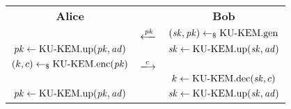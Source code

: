\begin{tabular}{cC{1cm}c}
    \textbf{Alice} &  & \textbf{Bob}\\
    & $\xlongleftarrow{\pk}$ & $(\sk, \pk)\getsr\KUKEMgen$\\
    $\pk\gets\KUKEMup(\pk, \ad)$ & & $\sk\gets\KUKEMup(\sk, \ad)$\\
    $(k, c)\getsr\KUKEMenc(\pk)$ & $\xlongrightarrow{c}$ & \\
    & & $k\gets\KUKEMdec(\sk, c)$\\ 
    $\pk\gets\KUKEMup(\pk, \ad)$ & & $\sk\gets\KUKEMup(\sk, \ad)$
\end{tabular}